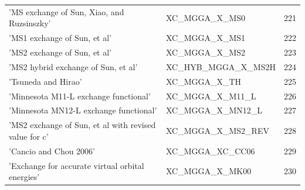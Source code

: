 \documentclass[final,12pt,makeidx,DIV=calc]{article}
\begin{document}
{{{{{{\begin{table}[!h]
\begin{center}
\begin{tabular}{llr}
  'MS exchange of Sun, Xiao, and Ruzsinszky' & XC\_MGGA\_X\_MS0  &221\\
  'MS1 exchange of Sun, et al' & XC\_MGGA\_X\_MS1  &222\\
  'MS2 exchange of Sun, et al' & XC\_MGGA\_X\_MS2  &223\\
  'MS2 hybrid exchange of Sun, et al' & XC\_HYB\_MGGA\_X\_MS2H  &224\\
  'Tsuneda and Hirao' & XC\_MGGA\_X\_TH  &225\\
  'Minnesota M11-L exchange functional' & XC\_MGGA\_X\_M11\_L  &226\\
  'Minnesota MN12-L exchange functional' & XC\_MGGA\_X\_MN12\_L  &227\\
  'MS2 exchange of Sun, et al with revised value for c' & XC\_MGGA\_X\_MS2\_REV  &228\\
  'Cancio and Chou 2006' & XC\_MGGA\_XC\_CC06  &229\\
  'Exchange for accurate virtual orbital energies' & XC\_MGGA\_X\_MK00  &230\\
\end{tabular}
\end{center}
\end{table}

}}}}}}
\end{document}
